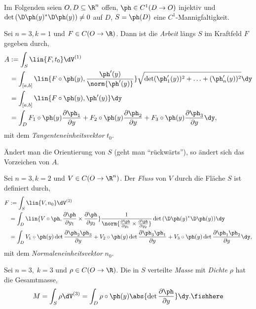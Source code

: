 \begin{bem}[Vereinbarung.]
Im Folgenden seien $O, D\subseteq\R^n$ offen, $\ph\in
C^1(D\to O)$ injektiv und $\det
\left(\D\ph(y)^{*}\D\ph(y)\right) \neq 0$ auf $D$,
$S=\ph(D)$ eine $C^1$-Mannigfaltigkeit.\maphere
\end{bem}

\begin{defn}
\label{defn:4.24}
Sei $n=3, k=1$ und $F\in C(O\to\R)$. Dann ist die \emph{Arbeit} längs $S$ im
Kraftfeld $F$ gegeben durch,
\begin{align*}
A &:= \int_S \lin{F,t_0}\dV^{(1)}  \\
&= \int_{[a,b]}
\lin{F\circ\ph(y),\frac{\ph'(y)}{\norm{\ph'(y)}}} \sqrt{\det
(\ph_1'(y))^2+\ldots+(\ph_n'(y))^2} \dy \\
&= \int_{[a,b]} \lin{F\circ\ph(y),\ph'(y)}\dy \\
&= \int_D F_1\circ\ph(y)\frac{\partial \ph_1}{\partial y}
+ F_2\circ\ph(y)\frac{\partial \ph_2}{\partial y}
+ F_3\circ\ph(y)\frac{\partial \ph_3}{\partial y} \dy,
\end{align*}
mit dem \emph{Tangenteneinheitsvektor} $t_0$.\fishhere
\end{defn}
\begin{bemn}[Achtung.]
Ändert man die Orientierung von $S$ (geht man ``rückwärts''), so ändert sich
das Vorzeichen von $A$.\maphere
\end{bemn}

\begin{defn}
\label{defn:4.25}
Sei $n=3, k=2$ und $V\in C(O\to\R^n)$. Der \emph{Fluss} von $V$ durch die
Fläche $S$ ist definiert durch,
\begin{align*}
F&:= \int_S \lin{V,n_0} \dV^{(2)}\\
&= \int_D \lin{V\circ\ph, \frac{\partial\ph}{\partial y_1}\times
\frac{\partial\ph}{\partial y_2}}\frac{1}{\norm{\frac{\partial\ph}{\partial y_1}\times
\frac{\partial\ph}{\partial y_2}}} \det{\left(\D\ph(y)^*\D\ph(y)\right)}\dy \\
&= \int_D V_1\circ\ph(y)\det \frac{\partial
\ph_2\ph_3}{\partial y} + V_2\circ\ph(y) \det \frac{\partial
\ph_3\ph_1}{\partial y} + V_3\circ\ph(y) \det \frac{\partial
\ph_1\ph_2}{\partial y} \dy,
\end{align*} 
mit dem \emph{Normaleneinheitsvektor} $n_0$.\fishhere
\end{defn}

\begin{defn}
\label{defn:4.26}
Sei $n=3,\; k=3$ und $\rho\in C(O\to\R)$. Die in $S$ verteilte \emph{Masse}
mit \emph{Dichte} $\rho$ hat die Gesamtmasse,
\begin{align*}
M = \int_S \rho \dV^{(3)} = \int_D \rho\circ\ph(y) \abs{\det \frac{\partial
\ph}{\partial y}}\dy.\fishhere
\end{align*}
\end{defn}


